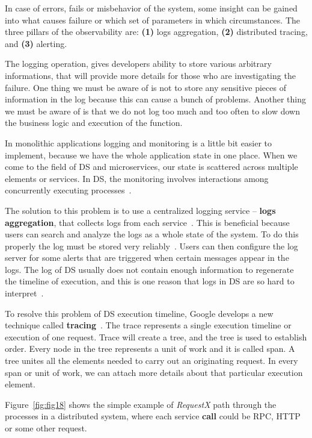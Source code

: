 In case of errors, fails or misbehavior of the system, some insight can be gained into what causes failure or which set of parameters in which circumstances. The three pillars of the observability are: \textbf{(1)} logs aggregation, \textbf{(2)} distributed tracing, and \textbf{(3)} alerting.

The logging operation, gives developers ability to store various arbitrary informations, that will provide more details for those who are investigating the failure. One thing we must be aware of is not to store any sensitive pieces of information in the log because this can cause a bunch of problems. Another thing we must be aware of is that we do not log too much and too often to slow down the business logic and execution of the function.

In monolithic applications logging and monitoring is a little bit easier to implement, because we have the whole application state in one place. When we come to the field of DS and microservices, our state is scattered across multiple elements or services. In DS, the monitoring involves interactions among concurrently executing processes~\cite{JoyceLSU87}.

The solution to this problem is to use a centralized logging service -- \textbf{logs aggregation}, that collects logs from each service~\cite{BeschastnikhWBE16}. This is beneficial because users can search and analyze the logs as a whole state of the system. To do this properly the log must be stored very reliably~\cite{DanielsST87}. Users can then configure the log server for some alerts that are triggered when certain messages appear in the logs. The log of DS usually does not contain enough information to regenerate the timeline of execution, and this is one reason that logs in DS are so hard to interpret~\cite{BeschastnikhWBE16}.

To resolve this problem of DS execution timeline, Google develops a new technique called \textbf{tracing}~\cite{36356}. The trace represents a single execution timeline or execution of one request. Trace will create a tree, and the tree is used to establish order. Every node in the tree represents a unit of work and it is called span. A tree unites all the elements needed to carry out an originating request. In every span or unit of work, we can attach more details about that particular execution element. 

Figure~\ref{fig:fig18} shows the simple example of \textit{RequestX} path through the processes in a distributed system, where each service \textbf{call} could be RPC, HTTP or some other request.

